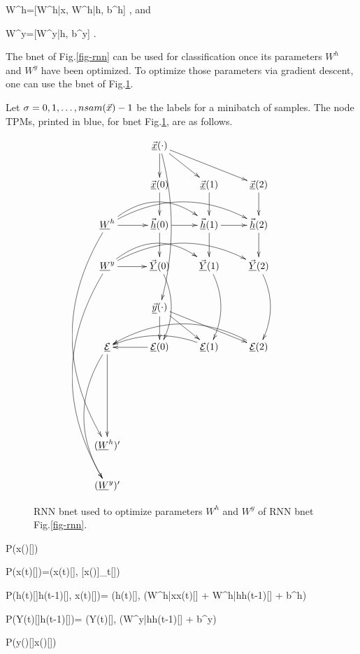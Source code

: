 \beq
W^h=[W^{h|x}, W^{h|h}, b^h]
\;,
\eeq
and

\beq
W^y=[W^{y|h}, b^y]
\;.
\eeq

The bnet of Fig.\ref{fig-rnn}
can be used for
classification once 
its parameters 
$W^h$ and $W^y$
have been optimized.
To optimize
those parameters via gradient
descent,
one can use the bnet 
of Fig.\ref{fig-rnn-ext}.

Let $\sigma=0,1, \ldots, nsam({\vec{x}})-1$
be the labels for a minibatch of samples.
The node TPMs,
 printed in blue,
for bnet Fig.\ref{fig-rnn-ext},
 are as follows.



\begin{figure}[h!]
\centering
$$\xymatrix{
&\ranvec{x}(\cdot)\ar[d]\ar[dr]\ar[drr]
\ar@/^1pc/[dddd]
\\
&\vec{\rvx}(0)\ar[d]&
\vec{\rvx}(1)\ar[d]&
\vec{\rvx}(2)\ar[d]\\
\rvW^h\ar[r]\ar@/^2pc/[rr]\ar@/^2pc/[rrr]
\ar@/_3pc/[dddddd]
&\vec{\rvh}(0)\ar[d]\ar[r]&
\vec{\rvh}(1)\ar[d]\ar[r]&
\vec{\rvh}(2)\ar[d]\\
\rvW^y\ar[r]\ar@/^2pc/[rr]\ar@/^2pc/[rrr]
\ar@/_3pc/[dddddd]
&\vec{\rvY}(0)\ar@/^1pc/[dd]&
\vec{\rvY}(1)\ar@/^1pc/[dd]&
\vec{\rvY}(2)\ar@/^1pc/[dd]
\\
&
\ranvec{y}(\cdot)\ar[d]\ar[dr]\ar[drr]
\\
\ul{\cale}\ar[ddd]
\ar@/_2pc/[dddd]&
\ul{\cale}(0)\ar[l]&
\ul{\cale}(1)\ar@/_1pc/[ll]&
\ul{\cale}(2)\ar@/_2pc/[lll]
\\
\\
\\
(\rvW^h)'\\
(\rvW^y)'
}
$$
\caption{RNN bnet used
to optimize parameters $W^h$
and $W^y$ of RNN bnet Fig.\ref{fig-rnn}.}
\label{fig-rnn-ext}
\end{figure}

\beq\color{blue}
P(x(\cdot)[\sigma])
\eeq

\beq\color{blue}
P(x(t)[\sigma])=\delta(x(t)[\sigma],
[x(\cdot)]_t[\sigma])
\eeq

\beq\color{blue}
P(h(t)[\sigma]\cond h(t-1)[\sigma], x(t)[\sigma])=
\delta(h(t)[\sigma],
\cala(W^{h|x}x(t)[\sigma] + W^{h|h}h(t-1)[\sigma] + b^h)
\eeq

\beq\color{blue}
P(Y(t)[\sigma]\cond h(t-1)[\sigma])=
\delta(Y(t)[\sigma],
\cala(W^{y|h}h(t-1)[\sigma] + b^y)
\eeq

\beq\color{blue}
P(y(\cdot)[\sigma]\cond x(\cdot)[\sigma])
\eeq

